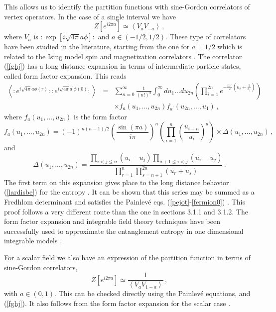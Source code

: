 \documentclass[a4paper]{article}
\begin{document}
This allows us to identify the partition functions with sine-Gordon correlators of vertex operators. In the case of a single interval we have  
\begin{equation}
Z[e^{i 2 \pi a}] \simeq \left< V_{a}V_{-a} \right>\,,\label{fghj}
\end{equation}
where $V_{a}$ is $:\exp[i\sqrt{4\pi}a \phi]:$ and  $a\in (-1/2,1/2)$. These type of correlators have been studied in the literature, starting from the one for $a=1/2$ which is related to the Ising model spin and magnetization correlators \cite{ising}. The correlator (\ref{fghj}) has a long distance expansion in terms of intermediate particle states, called form factor expansion. This reads
\begin{eqnarray}
\left\langle :e^{i\sqrt{4\pi } a \phi (r)}::e^{i\sqrt{4\pi } a
^{\prime }\phi (0)}:\right\rangle &=&\sum_{n=0}^{\infty }\frac{1}{\left(
n!\right) ^{2}}\int_{0}^{\infty }du_{1}...du_{2n}\left( \prod_{i=1}^{2n}e^{-
\frac{mr}{2}\left( u_{i}+\frac{1}{u_{i}}\right) }\right) \nonumber \\
&&\times f_{a }(u_{1},...,u_{2n})f_{a ^{\prime
}}(u_{2n},...,u_{1})\,,  \label{hache1}
\end{eqnarray}
where $f_{a }(u_{1},...,u_{2n})$ is the form factor
\begin{equation}
f_{a }(u_{1},...,u_{2n})=(-1)^{n(n-1)/2}\left( \frac{\sin \left( \pi
a \right) }{i\pi }\right) ^{n}\left( \prod_{i=1}^{n}\left( \frac{u_{i+n}
}{u_{i}}\right) ^{a }\right) \times \Delta (u_{1},...,u_{2n})\,,
\end{equation}
and
\begin{equation}
\Delta (u_{1},...,u_{2n})=\frac{\prod_{i<j\leq n}\left( u_{i}-u_{j}\right)
\prod_{n+1\leq i<j}\left( u_{i}-u_{j}\right) }{\prod_{r=1}^{n}
\prod_{s=n+1}^{2n}\left( u_{r}+u_{s}\right) }\,.
\end{equation}
The first term on this expansion gives place to the long distance behavior (\ref{lardisbe}) for the entropy \cite{fermion,ccd}. It can be shown that this series may be summed as a Fredhlom determinant and satisfies the Painlev\'e eqs. (\ref{pejot}-\ref{fermion0}) \cite{suma}.  This proof follows a very different route than the one in sections 3.1.1 and 3.1.2. 
The form factor expansion and integrable field theory techniques have been successfully used to approximate the entanglement entropy in one dimensional integrable models \cite{ccd,d1,dc}.    


For a scalar field we also have an expression of the partition function in terms of sine-Gordon correlators,
\begin{equation}
Z[e^{i 2 \pi a}] \simeq \frac{1}{\left< V_{a}V_{1-a} \right>}\,,
\end{equation}
with $a\in(0,1)$. This can be checked directly using the Painlev\'e equations, and (\ref{fghj}). It also follows from the form factor expansion for the scalar case \cite{mussardo}.
\end{document}
